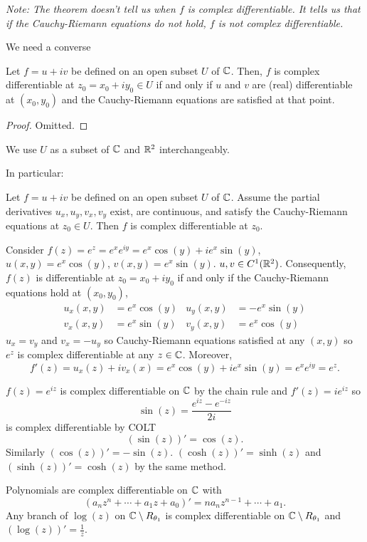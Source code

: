 \documentclass[10pt, a4paper]{article}
\begin{document}
\textit{Note:
The theorem doesn't tell us when $f$ is complex differentiable.
It tells us that if the Cauchy-Riemann equations do not hold,
$f$ is not complex differentiable.}

We need a converse
\begin{theorem}
    Let $f = u + iv$ be defined on an open subset $U$ of $\mathbb{C}$.
    Then,
    $f$ is complex differentiable at $z_0 = x_0 + iy_0 \in U$ if and only if $u$ and $v$ are
    (real)
    differentiable at $(x_0, y_0)$ and the Cauchy-Riemann equations are satisfied at that point.

    \begin{proof}
        Omitted.
    \end{proof}
\end{theorem}
We use $U$ as a subset of $\mathbb{C}$ and $\mathbb{R} ^ 2$ interchangeably.

In particular:
\begin{corollary}
    Let $f = u + iv$ be defined on an open subset $U$ of $\mathbb{C}$.
    Assume the partial derivatives $u_x, u_y, v_x, v_y$ exist,
    are continuous,
    and satisfy the Cauchy-Riemann equations at $z_0 \in U$.
    Then $f$ is complex differentiable at $z_0$.
\end{corollary}

Consider $f(z) = e ^ z = e ^ xe ^ {iy} = e ^ x\cos(y) + ie ^ x\sin(y)$,
$u(x, y) = e ^ x\cos(y)$,
$v(x, y) = e ^ x\sin(y)$.
$u, v \in C ^ {1}(\mathbb{R} ^ 2)$.
Consequently,
$f(z)$ is differentiable at $z_0 = x_0 + iy_0$ if and only if the Cauchy-Riemann equations hold at $(x_0, y_0)$,
\begin{align*}
    u_x(x, y) &= e ^ x\cos(y) & u_y(x, y) &= -e ^ x\sin(y) \\
    v_x(x, y) &= e ^ x\sin(y) & v_y(x, y) &= e ^ x\cos(y)
\end{align*}
$u_x = v_y$ and $v_x = -u_y$ so Cauchy-Riemann equations satisfied at any $(x, y)$ so $e ^ z$ is complex differentiable at any $z \in \mathbb{C}$.
Moreover,
\[
f'(z) = u_x(z) + iv_x(x) = e ^ x\cos(y) + ie ^ x\sin(y) = e ^ xe ^ {iy} = e ^ z.
\]

$f(z) = e ^ {iz}$ is complex differentiable on $\mathbb{C}$ by the chain rule and $f'(z) = ie ^ {iz}$ so
\[
\sin(z) = \frac{e ^ {iz} - e ^ {-iz}}{2i}
\]
is complex differentiable by COLT
\[
(\sin(z))' = \cos(z).
\]
Similarly $(\cos(z))' = -\sin(z)$.
$(\cosh(z))' = \sinh(z)$ and $(\sinh(z))' = \cosh(z)$ by the same method.

Polynomials are complex differentiable on $\mathbb{C}$ with
\[
(a_nz ^ n + \dotsi + a_1z + a_0)' = na_nz ^ {n - 1} + \dotsi + a_1.
\]
Any branch of $\log(z)$ on $\mathbb{C} \setminus R_{\theta_1}$ is complex differentiable on $\mathbb{C} \setminus R_{\theta_1}$ and $(\log(z))' = \frac{1}{z}$.
\end{document}
